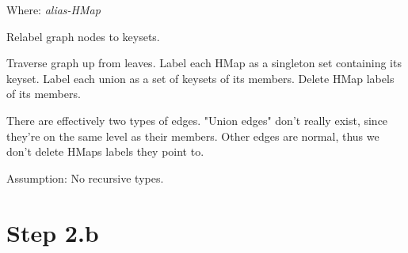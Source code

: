 Where: \emph{alias-HMap}

Relabel graph nodes to keysets.

Traverse graph up from leaves.
Label each HMap as a singleton set containing
its keyset.
Label each union as a set of keysets of its
members. Delete HMap labels of its members.

There are effectively two types of edges.
"Union edges" don't really exist, since
they're on the same level as their members.
Other edges are normal, thus we don't delete
HMaps labels they point to.

Assumption: No recursive types.

\section{Step 2.b}

